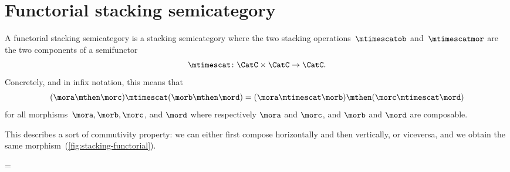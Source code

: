 
\section{Functorial stacking semicategory}

\begin{ctdefinition}
    \label{def:functorial-stacking-semi-cat}
    A functorial stacking semicategory is a stacking semicategory where the two stacking operations~$\mtimescatob$ and~$\mtimescatmor$ are the two components of a semifunctor
    \begin{equation}
        \mtimescat\colon \CatC \times \CatC \to \CatC.
    \end{equation}
    Concretely, and in infix notation, this means that
    \begin{equation}
        (\mora \mthen \morc ) \mtimescat (\morb \mthen \mord )
        =
        (\mora \mtimescat \morb )
        \mthen (\morc \mtimescat \mord )
    \end{equation}
    for all morphisms~$\mora, \morb, \morc$, and $\mord$ where respectively $\mora$ and $\morc$, and $\morb$ and $\mord$ are composable.
\end{ctdefinition}

%
This describes a sort of commutivity property: we can either first compose horizontally and then vertically, or viceversa, and we obtain the same morphism~(\cref{fig:stacking-functorial}).

\begin{figure*}[h]
    \centering
    =
    \caption{Commutation of stacking and composition in a functorial stacking semicategory. }
    \label{fig:stacking-functorial}
\end{figure*}

